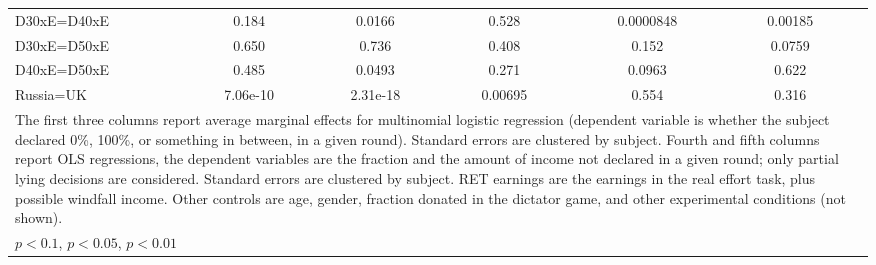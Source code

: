 \begin{tabular}{l|cccccc|cc|cc}
D30xE=D40xE     &    0.184         &         &   0.0166         &         &    0.528         &         &0.0000848         &         &  0.00185         &         \\
D30xE=D50xE     &    0.650         &         &    0.736         &         &    0.408         &         &    0.152         &         &   0.0759         &         \\
D40xE=D50xE     &    0.485         &         &   0.0493         &         &    0.271         &         &   0.0963         &         &    0.622         &         \\
Russia=UK       & 7.06e-10         &         & 2.31e-18         &         &  0.00695         &         &    0.554         &         &    0.316         &         \\
\hline\hline
\multicolumn{11}{p{18cm}}{\tiny The first three columns report average marginal effects for multinomial logistic regression (dependent variable is whether the subject declared 0\%, 100\%, or something in between, in a given round). Standard errors are clustered by subject. Fourth and fifth columns report OLS regressions, the dependent variables are the fraction and the amount of income not declared in a given round; only partial lying decisions are considered. Standard errors are clustered by subject. RET earnings are the earnings in the real effort task, plus possible windfall income. Other controls are age, gender, fraction donated in the dictator game, and other experimental conditions (not shown). }\\
\multicolumn{11}{l}{\tiny \sym{*} \(p<0.1\), \sym{**} \(p<0.05\), \sym{***} \(p<0.01\)}\\
\end{tabular}